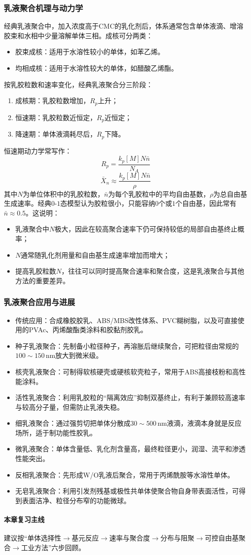 ﻿\documentclass[12pt,a4paper]{article}
\begin{document}
\subsubsection{乳液聚合机理与动力学}
经典乳液聚合中，加入浓度高于CMC的乳化剂后，体系通常包含单体液滴、增溶胶束和水相中少量溶解单体三相。成核可分两类：
\begin{itemize}
  \item 胶束成核：适用于水溶性较小的单体，如苯乙烯。
  \item 均相成核：适用于水溶性较大的单体，如醋酸乙烯酯。
\end{itemize}
按乳胶粒数和速率变化，经典乳液聚合分三阶段：
\begin{enumerate}[1)]
  \item 成核期：乳胶粒数增加，$R_p$上升；
  \item 恒速期：乳胶粒数近恒定，$R_p$近恒定；
  \item 降速期：单体液滴耗尽后，$R_p$下降。
\end{enumerate}
恒速期动力学常写作：
\[
R_p=\frac{k_p[M]N\bar{n}}{N_A}
\]
\[
\bar{X}_n\approx \frac{k_p[M]N\bar{n}}{\rho}
\]
其中$N$为单位体积中的乳胶粒数，$\bar{n}$为每个乳胶粒中的平均自由基数，$\rho$为总自由基生成速率。经典$0$-$1$态模型认为胶粒很小，只能容纳$0$个或$1$个自由基，因此常有$\bar{n}\approx0.5$。这说明：
\begin{itemize}
  \item 乳液聚合中$N$极大，因此在较高聚合速率下仍可保持较低的局部自由基终止概率；
  \item $N$通常随乳化剂用量和自由基生成速率增加而增大；
  \item 提高乳胶粒数$N$，往往可以同时提高聚合速率和聚合度，这是乳液聚合与其他方法的重要差异。
\end{itemize}

\subsubsection{乳液聚合应用与进展}
\begin{itemize}
  \item 传统应用：合成橡胶胶乳、ABS/MBS改性体系、PVC糊树脂，以及可直接使用的PVAc、丙烯酸酯类涂料和胶黏剂胶乳。
  \item 种子乳液聚合：先制备小粒径种子，再溶胀后继续聚合，可把粒径由常规的$100\sim150\,\mathrm{nm}$放大到微米级。
  \item 核壳乳液聚合：可制得软核硬壳或硬核软壳粒子，常用于ABS高接枝粉和高性能涂料。
  \item 活性乳液聚合：利用乳胶粒的“隔离效应”抑制双基终止，有利于兼顾较高速率与较高分子量，但需防止乳液失稳。
  \item 细乳液聚合：通过强剪切把单体分散成$30\sim500\,\mathrm{nm}$液滴，液滴本身就是反应场所，适于制功能性胶乳。
  \item 微乳液聚合：单体含量低、乳化剂含量高，最终粒径更小，润湿、流平和渗透性能突出。
  \item 反相乳液聚合：先形成W/O乳液后聚合，常用于丙烯酰胺等水溶性单体。
  \item 无皂乳液聚合：利用引发剂残基或极性共单体使聚合物自身带表面活性，可得到表面洁净、粒径分布窄的功能微球。
\end{itemize}

\paragraph{本章复习主线}
建议按“单体选择性$\rightarrow$基元反应$\rightarrow$速率与聚合度$\rightarrow$分布与阻聚$\rightarrow$可控自由基聚合$\rightarrow$工业方法”六步回顾。
\end{document}
